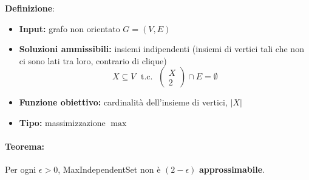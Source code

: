 \textbf{Definizione}: 
\begin{itemize}
	\item \textbf{Input:} grafo non orientato $G=(V,E)$
	
	\item \textbf{Soluzioni ammissibili:} insiemi indipendenti (insiemi di vertici tali che non ci sono lati tra loro, contrario di clique)
	$$ X \subseteq V \; \text{ t.c. } \; \left(\begin{array}{c}
		X \\ 2 
	\end{array}\right) \cap E = \emptyset $$
	
	\item \textbf{Funzione obiettivo:} cardinalità dell'insieme di vertici, $|X|$
	
	\item \textbf{Tipo:} massimizzazione $\max$
\end{itemize}

\paragraph{Teorema:} Per ogni $\epsilon > 0$, MaxIndependentSet non è $(2-\epsilon)$ \textbf{approssimabile}.\\


